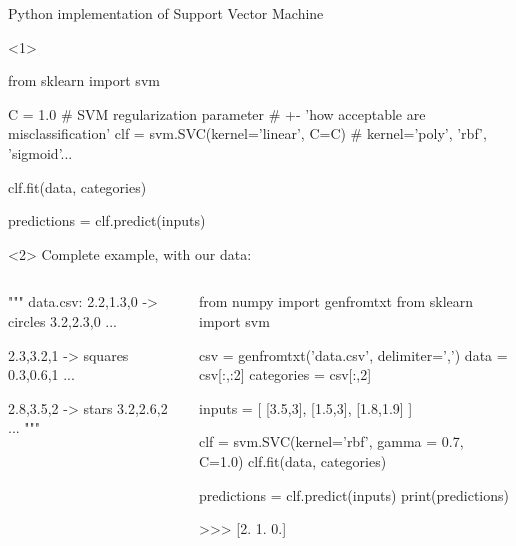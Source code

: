 \documentclass[compress]{beamer}
\begin{document}
\begin{frame}[fragile]{Python implementation of Support Vector Machine}

\begin{onlyenv}<1>

\begin{pythoncode}
from sklearn import svm

C = 1.0  # SVM regularization parameter 
         # +- 'how acceptable are misclassification'
clf = svm.SVC(kernel='linear', C=C) # kernel='poly', 'rbf', 'sigmoid'...

clf.fit(data, categories)

predictions = clf.predict(inputs)
\end{pythoncode}

\end{onlyenv}

\begin{onlyenv}<2>
    Complete example, with our data:

\begin{columns}
    \begin{column}{0.4\linewidth}
\begin{pythoncode}
""" data.csv:
2.2,1.3,0 -> circles
3.2,2.3,0
...

2.3,3.2,1 -> squares
0.3,0.6,1
...

2.8,3.5,2 -> stars
3.2,2.6,2
...
"""
\end{pythoncode}
        
    \end{column}
    \begin{column}{0.6\linewidth}
\begin{pythoncode}
from numpy import genfromtxt
from sklearn import svm

csv = genfromtxt('data.csv', delimiter=',')
data = csv[:,:2]
categories = csv[:,2]


inputs = [ [3.5,3], [1.5,3], [1.8,1.9] ]

clf = svm.SVC(kernel='rbf',
              gamma = 0.7,
              C=1.0)
clf.fit(data, categories)

predictions = clf.predict(inputs)
print(predictions)

>>>  [2.  1.  0.]

\end{pythoncode}
    \end{column}
\end{columns}

\end{onlyenv}


\end{frame}
\end{document}
